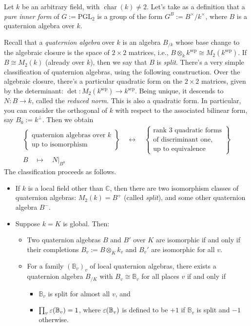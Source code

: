 \documentclass[reqno]{amsart} 
\numberwithin{theorem}{section}
\numberwithin{equation}{section}
\numberwithin{exercise}{section}
\begin{document}
Let $k$ be an arbitrary field, with $\operatorname{char}(k) \neq 2$.  Let's take as a definition that a \emph{pure inner form} of $G := \mathrm{PGL}_2$ is a group of the form $G^B := B^\times / k^\times$, where $B$ is a quaternion algebra over $k$.

Recall that a \emph{quaternion algebra} over $k$ is an algebra $B_{/k}$ whose base change to the algebraic closure is the space of $2 \times 2$ matrices, i.e., $B \otimes_k k^{\mathrm{sep}} \cong M_2(k^{\mathrm{sep}})$.  If $B \cong M_2(k)$ (already over $k$), then we say that $B$ is \emph{split}.  There's a very simple classification of quaternion algebras, using the following construction.  Over the algebraic closure, there's a particular quadratic form on the $2 \times 2$ matrices, given by the determinant: $\det : M_2(k^{\mathrm{sep}}) \rightarrow k^{\mathrm{sep}}$.  Being unique, it descends to $N : B \rightarrow k$, called the \emph{reduced norm}.  This is also a quadratic form.  In particular, you can consider the orthogonal of $k$ with respect to the associated bilinear form, say $B_0 := k^\perp$.  Then we obtain
\begin{gather*}
  \left\{
    \begin{array}{c}
      \text{quaternion algebras over } k \\
      \text{up to isomorphism}
    \end{array}
  \right\}
  \quad \longleftrightarrow \quad
  \left\{
    \begin{array}{c}
      \text{rank } 3 \text{ quadratic forms} \\
      \text{of discriminant one,} \\
      \text{up to equivalence}
    \end{array}
  \right\} \\[1em]
  B \quad \longmapsto \quad N|_{B^0}
\end{gather*}
The classification proceeds as follows.
\begin{itemize}
\item If $k$ is a local field other than $\mathbb{C}$, then there are two isomorphism classes of quaternion algebras: $M_2(k) = B^+$ (called \emph{split}), and some other quaternion algebra $B^-$.
\item Suppose $k = K$ is global.  Then:
  \begin{itemize}
  \item Two quaternion  algebras $B$ and $B'$ over $K$ are isomorphic if and only if their completions $B_v :=B \otimes_K k_v$ and $B_v '$ are isomorphic for all $v$.
  \item For a family $(\mathbb{B}_v)_v$ of local quaternion algebras, there exists a quaternion algebra $B_{/ K}$ with $B_v \cong \mathbb{B}_v$ for all places $v$ if and only if
    \begin{itemize}
    \item $\mathbb{B}_v$ is split for almost all $v$, and
    \item $\prod_v \varepsilon(\mathbb{B}_v) = 1$, where $\varepsilon(\mathbb{B}_v)$ is defined to be $+1$ if $\mathbb{B}_v$ is split and $- 1$ otherwise.
    \end{itemize}
  \end{itemize}
\end{itemize}
\end{document}
